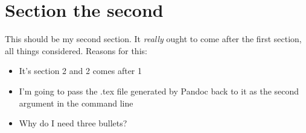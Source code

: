 \hypertarget{section-the-second}{%
\chapter{Section the second}\label{section-the-second}}

This should be my second section. It \emph{really} ought to come after
the first section, all things considered. Reasons for this:

\begin{itemize}
\tightlist
\item
  It's section 2 and 2 comes after 1
\item
  I'm going to pass the .tex file generated by Pandoc back to it as the
  second argument in the command line
\item
  Why do I need three bullets?
\end{itemize}
